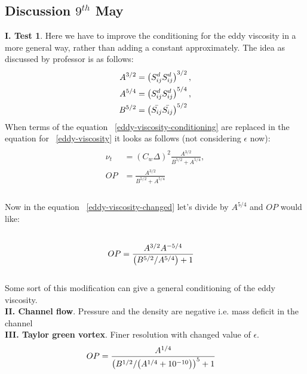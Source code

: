 \subsection{Discussion $9^{th}$ May}

{\bf I. Test 1}. Here we have to improve the conditioning for the eddy viscosity in a more general way, rather than adding a constant  approximately. The idea as discussed by professor is as follows:
\begin{equation}
\label{eddy-viscosity-conditioning}
\begin{split}
A^{3/2} &= \left({S_{ij}^{d}}{S_{ij}^{d}}\right)^{3/2},\\
A^{5/4} &= \left({S_{ij}^{d}}{S_{ij}^{d}}\right)^{5/4},\\
B^{5/2} &= \left(\bar{S_{ij}} \bar{S_{ij}}\right)^{5/2}
\end{split}
\end{equation}
When terms of the equation ~\ref{eddy-viscosity-conditioning} are replaced in the equation for ~\ref{eddy-viscosity} it looks as follows (not considering $\epsilon$ now):
\begin{equation}
\label{eddy-viscosity-changed}
\begin{split}\\
{\nu_t} &= \left({C_w}{\Delta}\right)^{2}
\frac{A^{3/2}}{B^{5/2} + {A^{5/4}}},\\
{OP} &= \frac{A^{3/2}}{B^{5/2} + {A^{5/4}}}\\
\end{split}
\end{equation}\\
Now in the equation ~\ref{eddy-viscosity-changed} let's divide by ${A^{5/4}}$ and ${OP}$ would like:
\begin{equation}
\label{some_modification}
\begin{split}\\
{OP} &= \frac{A^{3/2}A^{\--5/4}}{\left(B^{5/2}\// {A^{5/4}}\right) + 1}\\
\end{split}
\end{equation}\\
Some sort of this modification can give a general conditioning of the eddy viscosity.\\
{\bf II. Channel flow}.  Pressure and the density are negative i.e. mass deficit in the channel\\
{\bf III. Taylor green vortex}. Finer resolution with changed value of $\epsilon$. %
\begin{equation}
\label{some_modification}
\begin{split}
{OP} &= \frac{A^{1/4}}{\left(B^{1/2}\// {\left(A^{1/4} + 10^{-10}\right)}\right)^{5} + 1}
\end{split}
\end{equation}\\

